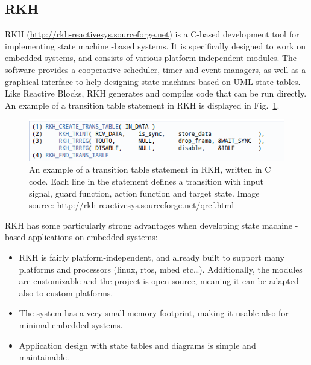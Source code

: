 \subsection{RKH}
\label{sec:rkh_state_machine}
RKH (\url{http://rkh-reactivesys.sourceforge.net}) is a C-based development tool for implementing state machine -based systems. It is specifically designed to work on embedded systems, and consists of various platform-independent modules. The software provides a cooperative scheduler, timer and event managers, as well as a graphical interface to help designing state machines based on UML state tables. Like Reactive Blocks, RKH generates and compiles code that can be run directly. An example of a transition table statement in RKH is displayed in Fig.~\ref{figure:rkh_transition}.

\begin{figure}[h]
	\centering
	\includegraphics[scale=0.7]{img/rkh_transition_table.png}
	\caption[A transition table statement in RKH]{An example of a transition table statement in RKH, written in C code. Each line in the statement defines a transition with input signal, guard function, action function and target state. Image source: \url{http://rkh-reactivesys.sourceforge.net/qref.html} \label{figure:rkh_transition} }
\end{figure}

RKH has some particularly strong advantages when developing state machine -based applications on embedded systems:
\begin{itemize}
\item RKH is fairly platform-independent, and already built to support many platforms and processors (linux, \gls{rtos}, mbed etc…). Additionally, the modules are customizable and the project is open source, meaning it can be adapted also to custom platforms.
\item The system has a very small memory footprint, making it usable also for minimal embedded systems.
\item Application design with state tables and diagrams is simple and maintainable.
\end{itemize}

